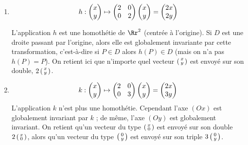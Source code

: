 \documentclass[11pt, class=report,crop=false]{standalone}
\begin{document}
\begin{enumerate}
  \item $$h  : \begin{pmatrix}x\cr y\end{pmatrix} 
\mapsto \begin{pmatrix}2&0\cr0&2\end{pmatrix} \begin{pmatrix}x\cr y\end{pmatrix}
= \begin{pmatrix}2x\cr 2y\end{pmatrix}$$

L'application $h$ est une homothétie de $\Rr^2$ (centrée à l'origine). Si $D$ est une droite passant par l'origine, alors elle est globalement invariante par cette transformation, c'est-à-dire si
$P \in D$ alors $h(P) \in D$ (mais on n'a pas $h(P)=P$). 
On retient ici que n'importe quel vecteur $\left(\begin{smallmatrix}x\cr y\end{smallmatrix}\right)$ est envoyé sur son double, $2\left(\begin{smallmatrix}x\cr y\end{smallmatrix}\right)$.

  \item $$k  : \begin{pmatrix}x\cr y\end{pmatrix} 
\mapsto \begin{pmatrix}2&0\cr0&3\end{pmatrix} \begin{pmatrix}x\cr y\end{pmatrix}
= \begin{pmatrix}2x\cr 3y\end{pmatrix}$$
L'application $k$ n'est plus une homothétie. Cependant l'axe $(Ox)$ est globalement invariant par $k$ ; 
de même, l'axe $(Oy)$ est globalement invariant.
On retient qu'un vecteur du type $\left(\begin{smallmatrix}x\cr 0\end{smallmatrix}\right)$ est envoyé sur son double $2\left(\begin{smallmatrix}x\cr 0\end{smallmatrix}\right)$, alors qu'un vecteur du type $\left(\begin{smallmatrix}0\cr y\end{smallmatrix}\right)$ est envoyé sur son triple $3\left(\begin{smallmatrix}0\cr y\end{smallmatrix}\right)$.
\end{enumerate}
\end{document}
